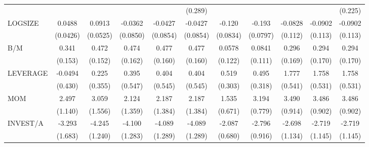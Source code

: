 \begin{table}[htbp]
\begin{tabular}{l*{10}{c}}
                &                  &                  &                  &                  &  (0.289)         &                  &                  &                  &                  &  (0.225)         \\
LOGSIZE         &   0.0488         &   0.0913\sym{*}  &  -0.0362         &  -0.0427         &  -0.0427         &   -0.120         &   -0.193\sym{**} &  -0.0828         &  -0.0902         &  -0.0902         \\
                & (0.0426)         & (0.0525)         & (0.0850)         & (0.0854)         & (0.0854)         & (0.0834)         & (0.0797)         &  (0.112)         &  (0.113)         &  (0.113)         \\
B/M             &    0.341\sym{**} &    0.472\sym{***}&    0.474\sym{***}&    0.477\sym{***}&    0.477\sym{***}&   0.0578         &   0.0841         &    0.296\sym{*}  &    0.294\sym{*}  &    0.294\sym{*}  \\
                &  (0.153)         &  (0.152)         &  (0.162)         &  (0.160)         &  (0.160)         &  (0.122)         &  (0.111)         &  (0.169)         &  (0.170)         &  (0.170)         \\
LEVERAGE        &  -0.0494         &    0.225         &    0.395         &    0.404         &    0.404         &    0.519\sym{*}  &    0.495         &    1.777\sym{***}&    1.758\sym{***}&    1.758\sym{***}\\
                &  (0.430)         &  (0.355)         &  (0.547)         &  (0.545)         &  (0.545)         &  (0.303)         &  (0.318)         &  (0.541)         &  (0.531)         &  (0.531)         \\
MOM             &    2.497\sym{**} &    3.059\sym{*}  &    2.124         &    2.187         &    2.187         &    1.535\sym{**} &    3.194\sym{***}&    3.490\sym{***}&    3.486\sym{***}&    3.486\sym{***}\\
                &  (1.140)         &  (1.556)         &  (1.359)         &  (1.384)         &  (1.384)         &  (0.671)         &  (0.779)         &  (0.914)         &  (0.902)         &  (0.902)         \\
INVEST/A        &   -3.293\sym{*}  &   -4.245\sym{***}&   -4.100\sym{***}&   -4.089\sym{***}&   -4.089\sym{***}&   -2.087\sym{***}&   -2.796\sym{***}&   -2.698\sym{**} &   -2.719\sym{**} &   -2.719\sym{**} \\
                &  (1.683)         &  (1.240)         &  (1.283)         &  (1.289)         &  (1.289)         &  (0.680)         &  (0.916)         &  (1.134)         &  (1.145)         &  (1.145)         \\

\end{tabular}
\end{table}
